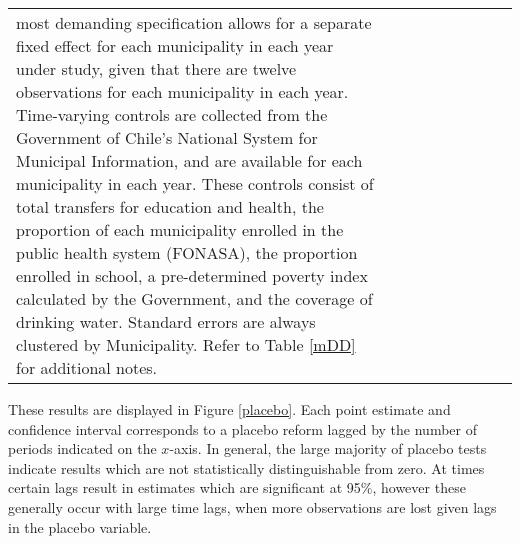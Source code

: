 \documentclass[12pt]{article}
\begin{document}
\begin{spacing}{1.4}
\begin{landscape}
\begin{table}
\begin{center}
{\begin{tabular}{lcccccccc}
{{          most demanding specification allows for a separate fixed effect for each
          municipality in each year under study, given that there are twelve
          observations for each municipality in each year.  Time-varying controls are
          collected from the Government of Chile's National System for Municipal Information,
          and are available for each municipality in each year.  These controls consist
          of total transfers for education and health, the proportion of each municipality
          enrolled in the public health system (FONASA), the proportion enrolled in school,
          a pre-determined poverty index calculated by the Government, and the coverage
          of drinking water.  Standard errors are always clustered by Municipality. Refer
          to Table \ref{mDD} for additional notes.}} \\
    \end{tabular}}
  \end{center}
\end{table}
\end{landscape}


These results are displayed in Figure \ref{placebo}.  Each point
estimate and confidence interval corresponds to a placebo reform
lagged by the number of periods indicated on the $x$-axis.  In
general, the large majority of placebo tests indicate results
which are not statistically distinguishable from zero.  At times
certain lags result in estimates which are significant at 95\%,
however these generally occur with large time lags, when more
observations are lost given lags in the placebo variable.


\end{spacing}
\end{document}
